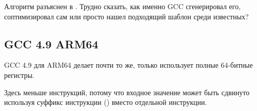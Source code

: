 Алгоритм разъяснен в .
Трудно сказать, как именно GCC сгенерировал его, соптимизировал сам или просто нашел подходящий шаблон среди известных?%

\subsection{\Optimizing GCC 4.9 ARM64}

GCC 4.9 для ARM64 делает почти то же, только использует полные 64-битные регистры.

Здесь меньше инструкций, потому что входное значение может быть сдвинуто используя суффикс инструкции ()
вместо отдельной инструкции.



